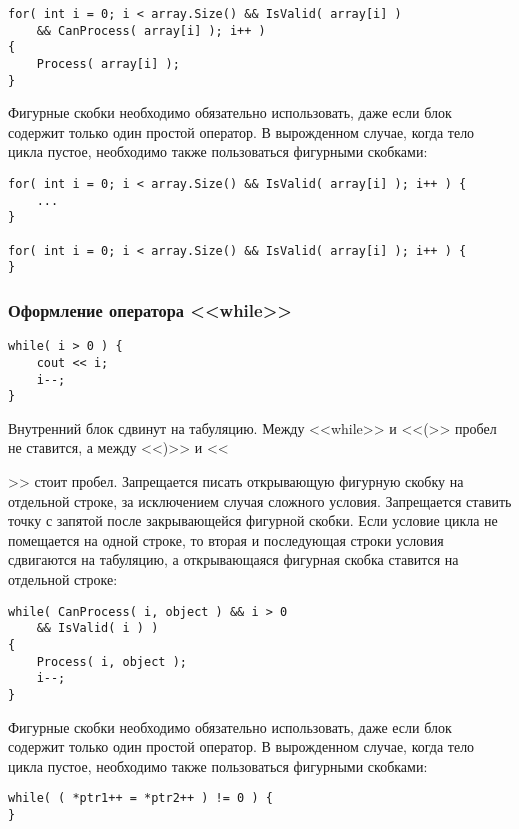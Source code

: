 {{\begin{lstlisting}[frame=single]
for( int i = 0; i < array.Size() && IsValid( array[i] )
    && CanProcess( array[i] ); i++ )
{
    Process( array[i] );
}
\end{lstlisting}

Фигурные скобки необходимо обязательно использовать, даже если блок содержит только один простой оператор. В вырожденном случае, когда тело цикла пустое, необходимо также пользоваться фигурными скобками:

\begin{lstlisting}[frame=single]
for( int i = 0; i < array.Size() && IsValid( array[i] ); i++ ) {
    ...
}

for( int i = 0; i < array.Size() && IsValid( array[i] ); i++ ) {
}
\end{lstlisting}

\newpage
\subsubsection{Оформление оператора <<while>>}

\begin{lstlisting}[frame=single]
while( i > 0 ) {
    cout << i;
    i--;
}
\end{lstlisting}

Внутренний блок сдвинут на табуляцию. Между <<while>> и <<(>> пробел не ставится, а между <<)>> и <<{>> стоит пробел. Запрещается писать открывающую фигурную скобку на отдельной строке, за исключением случая сложного условия. Запрещается ставить точку с запятой после закрывающейся фигурной скобки. Если условие цикла не помещается на одной строке, то вторая и последующая строки условия сдвигаются на табуляцию, а открывающаяся фигурная скобка ставится на отдельной строке:
	
\begin{lstlisting}[frame=single]
while( CanProcess( i, object ) && i > 0
    && IsValid( i ) )
{
    Process( i, object );
    i--;
}
\end{lstlisting}	

Фигурные скобки необходимо обязательно использовать, даже если блок содержит только один простой оператор. В вырожденном случае, когда тело цикла пустое, необходимо также пользоваться фигурными скобками:

\begin{lstlisting}[frame=single]
while( ( *ptr1++ = *ptr2++ ) != 0 ) {
}
\end{lstlisting}

}}}
